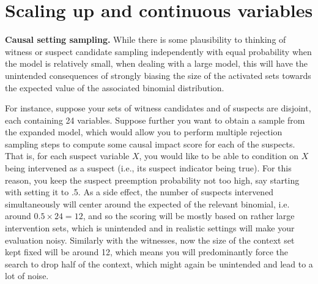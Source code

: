 \documentclass[anon,12pt]{clear2025} %
\begin{document}




\section{Scaling up and continuous variables}
\label{sec:scaling}


\vspace{2mm}
\noindent \textbf{Causal setting sampling.} While there is some plausibility to thinking of witness or suspect candidate sampling independently with equal probability when the model is relatively small, when dealing with a large model, this will have the unintended consequences of strongly biasing the size of the activated sets towards the expected value of the associated binomial distribution. 

For instance, suppose your sets of witness candidates and of suspects are disjoint, each containing 24 variables. Suppose further you want to obtain a sample from the expanded model, which would allow you to perform multiple rejection sampling steps to compute some causal impact score for each of the suspects. That is, for each suspect variable $X$, you would like to be able to condition on $X$ being intervened as a suspect (i.e., its suspect indicator being true). For this reason, you keep the suspect preemption probability not too high, say starting with setting it to .5. As a side effect, the number of suspects intervened simultaneously will center around the expected of the relevant binomial, i.e. around $0.5 \times 24 = 12$, and so the scoring will be mostly based on rather large intervention sets, which is unintended and in realistic settings will make your evaluation noisy. Similarly with the witnesses, now the size of the context set kept fixed will be around 12, which means you will predominantly force the search to drop half of the context, which might again be unintended and lead to a lot of noise. 
\end{document}
